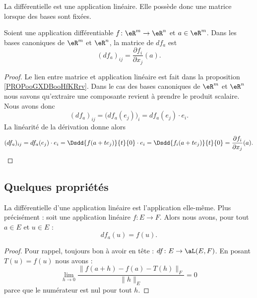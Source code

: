 La différentielle est une application linéaire. Elle possède donc une matrice lorsque des bases sont fixées.
\begin{proposition}     \label{PROPooBMROooThgLuU}
    Soient une application différentiable \( f\colon \eR^m\to \eR^n\) et \( a\in \eR^m\). Dans les bases canoniques de \( \eR^m\) et \( \eR^n\), la matrice de \( df_a\) est
    \begin{equation}
        (df_a)_{ij}=\frac{ \partial f_i }{ \partial x_j }(a).
    \end{equation}
\end{proposition}

\begin{proof}
    Le lien entre matrice et application linéaire est fait dans la proposition \ref{PROPooGXDBooHfKRrv}. Dans le cas des bases canoniques de \( \eR^m\) et \( \eR^n\) nous savons qu'extraire une composante revient à prendre le produit scalaire. Nous avons donc
    \begin{equation}
        (df_a)_{ij}=\big( df_a(e_j) \big)_i=df_a(e_j)\cdot e_i.
    \end{equation}
    La linéarité de la dérivation donne alors
    \begin{equation}
        (df_a)_{ij}=df_a(e_j)\cdot e_i=\Dsdd{ f(a+te_j) }{t}{0}\cdot e_i=\Dsdd{ f_i(a+te_j) }{t}{0}=\frac{ \partial f_i }{ \partial x_j }(a).
    \end{equation}
\end{proof}

\subsection{Quelques propriétés}

\begin{lemma}       \label{LEMooZSNMooCfjzOB}
    La différentielle d'une application linéaire est l'application elle-même. Plus précisément : soit une application linéaire \( f\colon E\to F\). Alors nous avons, pour tout \( a\in E\) et \( u\in E\) :
    \begin{equation}
        df_a(u)=f(u).
    \end{equation}
\end{lemma}

\begin{proof}
    Pour rappel, toujours bon à avoir en tête : \( df\colon E\to \aL(E,F)\). En posant \( T(u)=f(u)\) nous avons :
    \begin{equation}
        \lim_{h\to 0} \frac{ \| f(a+h)-f(a)- T(h) \|_F }{ \| h \|_E }=0
    \end{equation}
    parce que le numérateur est nul pour tout \( h\).
\end{proof}

